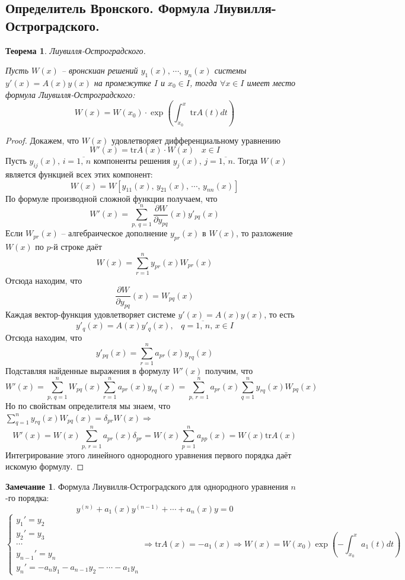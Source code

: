 \documentclass[a4paper,12pt]{article}
\theoremstyle{plain}
\newtheorem{theorem}{Теорема}[section]
\theoremstyle{definition}
\newtheorem*{note}{Замечание}
\theoremstyle{remark}
\begin{document}
\subsection{Определитель Вронского. Формула Лиувилля-Остроградского.}
\begin{theorem}
	Лиувилля-Остроградского.

	Пусть $W(x)$ -- вронскиан решений $y_1(x),\,\cdots,\,y_n(x)$ системы $y'(x) = A(x)y(x)$ на промежутке $I$ и $x_0 \in I$, тогда $\forall x \in I$ имеет место формула Лиувилля-Остроградского:
	\[W(x) = W(x_0) \cdot \exp\left(\int_{x_0}^x \text{tr}A(t)dt\right)\]
\end{theorem}

\begin{proof}
	Докажем, что $W(x)$ удовлетворяет дифференциальному уравнению
	\[W'(x) = \text{tr}A(x)\cdot W(x)\;\;\; x \in I\]
	Пусть $y_{ij}(x),\, i=\overline{1,\,n}$ компоненты решения $y_j(x),\, j=\overline{1,\,n}$. Тогда $W(x)$ является функцией всех этих компонент:
	\[W(x) = W[y_{11}(x),\,y_{21}(x),\,\cdots,\,y_{nn}(x)]\]
	По формуле производной сложной функции получаем, что
	\[W'(x) = \sum_{p,\,q = 1}^n \frac{\partial W}{\partial y_{pq}}(x)y'_{pq}(x)\]
	Если $W_{pr}(x)$ -- алгебраическое дополнение $y_{pr}(x)$ в $W(x)$, то разложение $W(x)$ по $p$-й строке даёт
	\[W(x) = \sum_{r = 1}^n y_{pr}(x)W_{pr}(x)\]
	Отсюда находим, что
	\[\frac{\partial W}{\partial y_{pq}}(x) = W_{pq}(x)\]
	Каждая вектор-функция удовлетворяет системе $y'(x) = A(x)y(x)$, то есть
	\[y'_q(x) = A(x)y'_q(x),\;\;\; q=\overline{1,\,n},\, x \in I\]
	Отсюда находим, что
	\[y'_{pq}(x) = \sum_{r = 1}^n a_{pr}(x)y_{rq}(x)\]
	Подставляя найденные выражения в формулу $W'(x)$ получим, что
	\[W'(x) = \sum_{p,\,q = 1}^n W_{pq}(x)\sum_{r = 1}^n a_{pr}(x)y_{rq}(x) = \sum_{p,\,r = 1}^n a_{pr}(x) \sum_{q = 1}^n y_{rq}(x)W_{pq}(x)\]
	Но по свойствам определителя мы знаем, что
	$\sum_{q = 1}^n y_{rq}(x)W_{pq}(x) = \delta_{pr}W(x) \Rightarrow$
	\[W'(x) = W(x)\sum_{p,\,r = 1}^n a_{pr}(x) \delta_{pr} = W(x) \sum_{p = 1}^n a_{pp}(x) = W(x)\text{tr}A(x)\]
	Интегрирование этого линейного однородного уравнения первого порядка даёт искомую формулу.
\end{proof}

\begin{note}
	Формула Лиувилля-Остроградского для однородного уравнения $n$-го порядка:
	\[y^{(n)} + a_1(x)y^{(n-1)}+\cdots + a_n(x)y = 0\]
	\[\begin{cases}
			y_1' = y_2     \\
			y_2' = y_3     \\
			\cdots         \\
			y_{n-1}' = y_n \\
			y_n' = -a_ny_1 - a_{n-1}y_2 - \cdots - a_1y_n
		\end{cases} \Rightarrow \text{tr}A(x) = -a_1(x) \Rightarrow W(x) = W(x_0)\exp\left(-\int_{x_0}^x a_1(t)dt\right)\]
\end{note}
\end{document}
